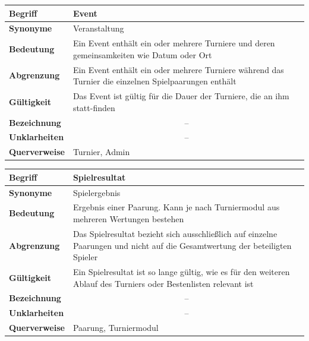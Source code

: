 \documentclass[11pt]{article}
\begin{document}
\begin{tabularx}{\textwidth}{| p{} | p{} |}
	\hline
	\textbf{Begriff} & Event\\
	\hline
	\textbf{Synonyme} & Veranstaltung \\
	\hline
	\textbf{Bedeutung} & Ein Event enthält ein oder mehrere Turniere und deren gemeinsamkeiten wie Datum oder Ort\\
	\hline
	\textbf{Abgrenzung} & Ein Event enthält ein oder mehrere Turniere während das Turnier die einzelnen Spielpaarungen enthält\\
	\hline
	\textbf{Gültigkeit} & Das Event ist gültig für die Dauer der Turniere, die an ihm statt-finden\\
	\hline
	\textbf{Bezeichnung} & \multicolumn{1}{|c|}{--} \\
	\hline
	\textbf{Unklarheiten} & \multicolumn{1}{|c|}{--} \\
	\hline
	\textbf{Querverweise} & Turnier, Admin\\
	\hline
\end{tabularx}

\begin{tabularx}{\textwidth}{| p{} | p{} |}
	\hline
	\textbf{Begriff} & Spielresultat\\
	\hline
	\textbf{Synonyme} & Spielergebnis \\
	\hline
	\textbf{Bedeutung} & Ergebnis einer Paarung. Kann je nach Turniermodul aus mehreren Wertungen bestehen\\
	\hline
	\textbf{Abgrenzung} & Das Spielresultat bezieht sich ausschließlich auf einzelne Paarungen und nicht auf die Gesamtwertung der beteiligten Spieler\\
	\hline
	\textbf{Gültigkeit} & Ein Spielresultat ist so lange gültig, wie es für den weiteren Ablauf des Turniers oder Bestenlisten relevant ist \\
	\hline
	\textbf{Bezeichnung} & \multicolumn{1}{|c|}{--} \\
	\hline
	\textbf{Unklarheiten} & \multicolumn{1}{|c|}{--} \\
	\hline
	\textbf{Querverweise} & Paarung, Turniermodul\\
	\hline
\end{tabularx}

\newpage
\end{document}
